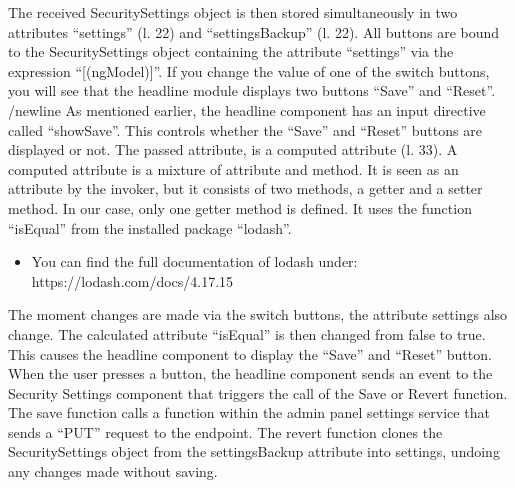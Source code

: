 The received SecuritySettings object is then stored simultaneously in two attributes \enquote{settings} (l. 22) and \enquote{settingsBackup} (l. 22).
All buttons are bound to the SecuritySettings object containing the attribute \enquote{settings} via the expression \enquote{[(ngModel)]}.
If you change the value of one of the switch buttons, you will see that the headline module displays two buttons \enquote{Save} and \enquote{Reset}. /newline As mentioned earlier, the headline component has an input directive called \enquote{showSave}. This controls whether the \enquote{Save} and \enquote{Reset} buttons are displayed or not. The passed attribute, is a computed attribute (l. 33). A computed attribute is a mixture of attribute and method. It is seen as an attribute by the invoker, but it consists of two methods, a getter and a setter method. In our case, only one getter method is defined.
It uses the function \enquote{isEqual} from the installed package \enquote{lodash}.
\begin{itemize}
    \item You can find the full documentation of lodash under: https://lodash.com/docs/4.17.15
\end{itemize}
The moment changes are made via the switch buttons, the attribute settings also change. The calculated attribute \enquote{isEqual} is then changed from false to true. This causes the headline component to display the \enquote{Save} and \enquote{Reset} button. When the user presses a button, the headline component sends an event to the Security Settings component that triggers the call of the Save or Revert function. \\
The save function calls a function within the admin panel settings service that sends a \enquote{PUT} request to the endpoint.
The revert function clones the SecuritySettings object from the settingsBackup attribute into settings, undoing any changes made without saving.

